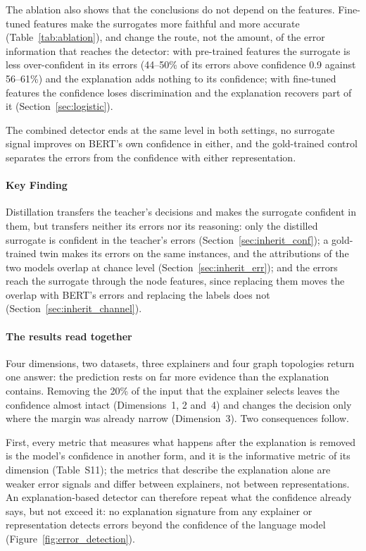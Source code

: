 \documentclass[preprint, times, review, 10pt]{elsarticle}
\begin{document}
The ablation also shows that the conclusions do not depend on the features. Fine-tuned features make the surrogates more faithful and more accurate (Table~\ref{tab:ablation}), and change the route, not the amount, of the error information that reaches the detector: with pre-trained features the surrogate is less over-confident in its errors (44--50\% of its errors above confidence 0.9 against 56--61\%) and the explanation adds nothing to its confidence; with fine-tuned features the confidence loses discrimination and the explanation recovers part of it (Section~\ref{sec:logistic}).

The combined detector ends at the same level in both settings, no surrogate signal improves on BERT's own confidence in either, and the gold-trained control separates the errors from the confidence with either representation.

\paragraph{\textbf{Key Finding}}
Distillation transfers the teacher's decisions and makes the surrogate confident in them, but transfers neither its errors nor its reasoning: only the distilled surrogate is confident in the teacher's errors (Section~\ref{sec:inherit_conf}); a gold-trained twin makes its errors on the same instances, and the attributions of the two models overlap at chance level (Section~\ref{sec:inherit_err}); and the errors reach the surrogate through the node features, since replacing them moves the overlap with BERT's errors and replacing the labels does not (Section~\ref{sec:inherit_channel}).

\paragraph{\textbf{The results read together}}
Four dimensions, two datasets, three explainers and four graph topologies return one answer: the prediction rests on far more evidence than the explanation contains. Removing the 20\% of the input that the explainer selects leaves the confidence almost intact (Dimensions~1, 2 and~4) and changes the decision only where the margin was already narrow (Dimension~3). Two consequences follow.

First, every metric that measures what happens after the explanation is removed is the model's confidence in another form, and it is the informative metric of its dimension (Table~S11); the metrics that describe the explanation alone are weaker error signals and differ between explainers, not between representations. An explanation-based detector can therefore repeat what the confidence already says, but not exceed it: no explanation signature from any explainer or representation detects errors beyond the confidence of the language model (Figure~\ref{fig:error_detection}).
\end{document}
